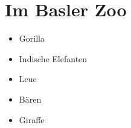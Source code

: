 \section{Im Basler Zoo}

\begin{itemize}
 
\item Gorilla
 
\item Indische Elefanten
 
\item Leue

\item Bären

\item Giraffe

\end{itemize}
   


